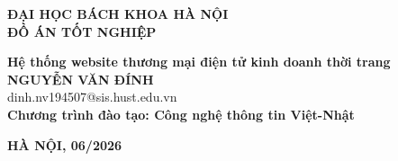 \documentclass[DoAn.tex]{subfiles}
\begin{document}
\begin{titlepage}
\thispagestyle{empty}
\begin{center}

{\textbf{\large{ĐẠI HỌC BÁCH KHOA HÀ NỘI}}}\\[2cm]

{\textbf{\huge{ ĐỒ ÁN TỐT NGHIỆP}}}\\[1cm]
{\textbf{\Large{Hệ thống website thương mại điện tử kinh doanh thời trang}}\\[1cm]

{\textbf{\large{NGUYỄN VĂN ĐÍNH}}}\\
{\large{dinh.nv194507@sis.hust.edu.vn}}\\[0.5cm]

{\textbf{\large{Chương trình đào tạo: Công nghệ thông tin Việt-Nhật
}}}\\
\vspace{2cm}
\begin{table}[H]
\centering
{}
\end{table}}
\end{center}

\vfill
\begin{center}
\textbf{HÀ NỘI, 06/2026}
\end{center}

\end{titlepage}
\end{document}
